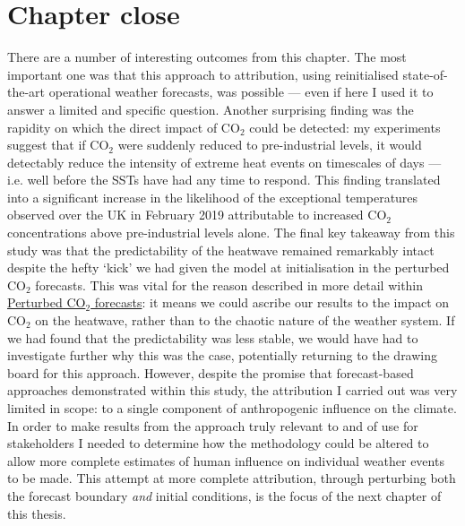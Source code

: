 \section{Chapter close}\label{ch3:close}

  There are a number of interesting outcomes from this chapter. The most important one was that this approach to attribution, using reinitialised state-of-the-art operational weather forecasts, was possible --- even if here I used it to answer a limited and specific question. Another surprising finding was the rapidity on which the direct impact of CO$_2$ could be detected: my experiments suggest that if CO$_2$ were suddenly reduced to pre-industrial levels, it would detectably reduce the intensity of extreme heat events on timescales of days --- i.e. well before the SSTs have had any time to respond. This finding translated into a significant increase in the likelihood of the exceptional temperatures observed over the UK in February 2019 attributable to increased CO$_2$ concentrations above pre-industrial levels alone. The final key takeaway from this study was that the predictability of the heatwave remained remarkably intact despite the hefty `kick' we had given the model at initialisation in the perturbed CO$_2$ forecasts. This was vital for the reason described in more detail within \hyperref[ch3:experiments]{Perturbed CO$_2$ forecasts}: it means we could ascribe our results to the impact on CO$_2$ on the heatwave, rather than to the chaotic nature of the weather system. If we had found that the predictability was less stable, we would have had to investigate further why this was the case, potentially returning to the drawing board for this approach. However, despite the promise that forecast-based approaches demonstrated within this study, the attribution I carried out was very limited in scope: to a single component of anthropogenic influence on the climate. In order to make results from the approach truly relevant to and of use for stakeholders I needed to determine how the methodology could be altered to allow more complete estimates of human influence on individual weather events to be made. This attempt at more complete attribution, through perturbing both the forecast boundary \emph{and} initial conditions, is the focus of the next chapter of this thesis.